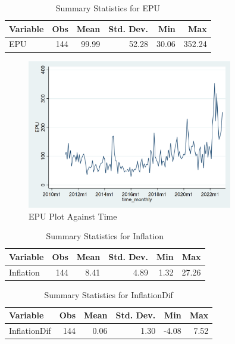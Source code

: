 \documentclass[11pt]{article}
\begin{document}
\begin{table}[ht]
\centering
\begin{tabular}{lrrrrr}
\hline
Variable & Obs & Mean & Std. Dev. & Min & Max \\
\hline
EPU & 144 & 99.99 & 52.28 & 30.06 & 352.24 \\
\hline
\end{tabular}
\caption{Summary Statistics for EPU}
\label{table:summary_statistics}
\end{table}



\begin{figure}[h]
\centering
\includegraphics[width=0.8\textwidth]{images/Figure4.png}
\caption{EPU Plot Against Time}
\end{figure}

\begin{table}[ht]
\centering
\begin{tabular}{lrrrrr}
\hline
Variable & Obs & Mean & Std. Dev. & Min & Max \\
\hline
Inflation & 144 & 8.41 & 4.89 & 1.32 & 27.26 \\
\hline
\end{tabular}
\caption{Summary Statistics for Inflation}
\label{table:inflation_summary_statistics}
\end{table}

\begin{table}[ht]
\centering
\begin{tabular}{lrrrrr}
\hline
Variable & Obs & Mean & Std. Dev. & Min & Max \\
\hline
InflationDif & 144 & 0.06 & 1.30 & -4.08 & 7.52 \\
\hline
\end{tabular}
\caption{Summary Statistics for InflationDif}
\label{table:inflationdif_summary_statistics}
\end{table}
\end{document}
